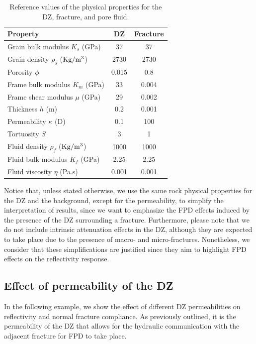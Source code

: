 \documentclass[draft]{agujournal2019}
\begin{document}
\begin{table}[!ht]
  \caption{Reference values of the physical properties for the DZ, fracture, and pore fluid.}
\begin{center}
  \begin{tabular}{ | l | c | c| }
    \hline
    Property & DZ & Fracture \\ \hline
    Grain bulk modulus $K_s$ (\rm{GPa}) & 37 & 37 \\ 
    Grain density $\rho_s$ ($\rm{Kg/m^3}$) & 2730 & 2730 \\
    Porosity $\phi$ & 0.015 & 0.8 \\
    Frame bulk modulus $K_m$ (\rm{GPa}) & 33 & 0.004\\ 
    Frame shear modulus $\mu$ (\rm{GPa}) & 29 & 0.002 \\
    Thickness $h$ (m) & 0.2 & 0.001\\ 
    Permeability $\kappa$ (D) & 0.1 & 100\\
    Tortuosity $S$ & 3 & 1\\
    Fluid density $\rho_f$ ($\rm{Kg/m^3}$) & 1000 & 1000\\
    Fluid bulk modulus $K_f$ (\rm{GPa}) & 2.25 & 2.25\\
    Fluid viscosity $\eta$ (\rm{Pa.s})& 0.001 & 0.001\\
    \hline
  \end{tabular}
  \label{table:1}
\end{center}
\end{table}

Notice that, unless stated otherwise, we use the same rock physical properties for the DZ and the background, except for the permeability, to simplify the interpretation of results, since we want to emphasize the FPD effects induced by the presence of the DZ surrounding a fracture. 
Furthermore, please note that we do not include intrinsic attenuation effects in the DZ, although they are expected to take place due to the presence of macro- and micro-fractures. Nonetheless, we consider that these simplifications are justified since they aim to highlight FPD effects on the reflectivity response.


\subsection{ Effect of permeability of the DZ}
In the following example, we show the effect of different DZ permeabilities on reflectivity and  normal fracture compliance. As previously outlined, it is the permeability of the DZ that allows for the hydraulic communication with the adjacent fracture for FPD to take place.
\end{document}
